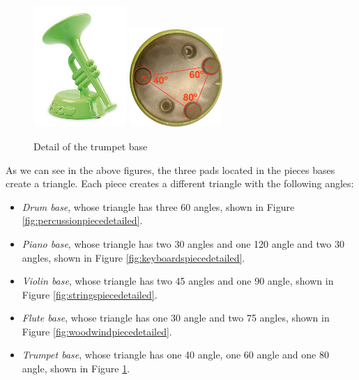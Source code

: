 \begin{figure}[ht!]
	\centering
	\includegraphics[width=100pt]{graphics/architecture/pieces/pieceBrass.jpg}
	\vspace{0.6cm}
	\includegraphics[width=100pt]{graphics/architecture/pieces/brassBaseAngles.png}
	\caption{Detail of the trumpet base}
	\label{fig:brasspiecedetailed}
\end{figure}

\FloatBarrier

As we can see in the above figures, the three pads located in the pieces bases create a triangle. Each piece creates a different triangle with the following angles:
\begin{itemize}
\item \textit{Drum base}, whose triangle has three 60\textdegree\xspace angles, shown in Figure \ref{fig:percussionpiecedetailed}.
\item \textit{Piano base}, whose triangle has two 30\textdegree\xspace angles and one 120\textdegree\xspace angle and two 30\textdegree\xspace angles, shown in Figure \ref{fig:keyboardspiecedetailed}.
\item \textit{Violin base}, whose triangle has two 45\textdegree\xspace angles and one 90\textdegree\xspace angle, shown in Figure \ref{fig:stringspiecedetailed}.
\item \textit{Flute base}, whose triangle has one 30\textdegree\xspace angle and two 75\textdegree\xspace angles, shown in Figure \ref{fig:woodwindpiecedetailed}.
\item \textit{Trumpet base}, whose triangle has one 40\textdegree\xspace angle, one 60\textdegree\xspace angle and one 80\textdegree\xspace angle, shown in Figure \ref{fig:brasspiecedetailed}.
\end{itemize}

